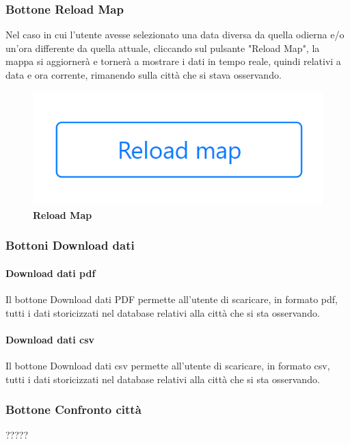 \subsubsection{Bottone Reload Map} \label{UtilizzoDiGDPGatheringDetecionPlatformContenutoCentralePaginaInizialeHomeBottoneReloadMap}
Nel caso in cui l'utente avesse selezionato una data diversa da quella odierna e/o un'ora differente da quella attuale, cliccando sul pulsante "Reload Map", la mappa si aggiornerà e tornerà a mostrare i dati in tempo reale, quindi relativi a data e ora corrente, rimanendo sulla città che si stava osservando. 
\begin{center}
	\begin{figure}[H]
		\centering\includegraphics[width=0.3\linewidth]{../immagini/manualeUtente/ReloadMap.png}
		\caption{\textbf{Reload Map}}
	\end{figure}
\end{center}

\subsubsection{Bottoni Download dati} \label{UtilizzoDiGDPGatheringDetecionPlatformContenutoCentralePaginaInizialeHomeBottoneDownloadDati}
\paragraph{Download dati pdf} 
Il bottone Download dati PDF permette all'utente di scaricare, in formato pdf, tutti i dati storicizzati nel database relativi alla città che si sta osservando. 

\paragraph{Download dati csv} 
Il bottone Download dati csv permette all'utente di scaricare, in formato csv, tutti i dati storicizzati nel database relativi alla città che si sta osservando. 

\subsubsection{Bottone Confronto città} \label{UtilizzoDiGDPGatheringDetecionPlatformContenutoCentralePaginaInizialeHomeBottoneConfrontoCitta}
?????
